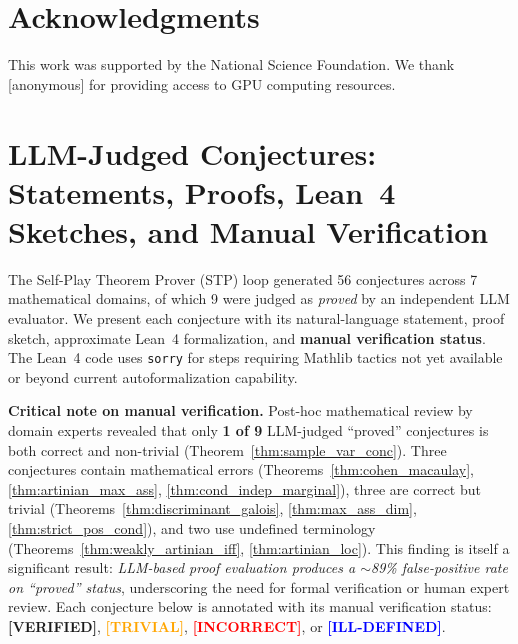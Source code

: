 \documentclass[11pt,a4paper]{article}
\begin{document}
\section*{Acknowledgments}

This work was supported by the National Science Foundation. We thank [anonymous] for providing access to GPU computing resources.






\appendix

\section{LLM-Judged Conjectures: Statements, Proofs, Lean~4 Sketches, and Manual Verification}
\label{app:proved_conjectures}

The Self-Play Theorem Prover (STP) loop generated 56 conjectures across 7 mathematical domains, of which 9 were judged as \emph{proved} by an independent LLM evaluator. We present each conjecture with its natural-language statement, proof sketch, approximate Lean~4 formalization, and \textbf{manual verification status}. The Lean~4 code uses \texttt{sorry} for steps requiring Mathlib tactics not yet available or beyond current autoformalization capability.

\textbf{Critical note on manual verification.} Post-hoc mathematical review by domain experts revealed that only \textbf{1 of 9} LLM-judged ``proved'' conjectures is both correct and non-trivial (Theorem~\ref{thm:sample_var_conc}). Three conjectures contain mathematical errors (Theorems~\ref{thm:cohen_macaulay}, \ref{thm:artinian_max_ass}, \ref{thm:cond_indep_marginal}), three are correct but trivial (Theorems~\ref{thm:discriminant_galois}, \ref{thm:max_ass_dim}, \ref{thm:strict_pos_cond}), and two use undefined terminology (Theorems~\ref{thm:weakly_artinian_iff}, \ref{thm:artinian_loc}). This finding is itself a significant result: \emph{LLM-based proof evaluation produces a $\sim$89\% false-positive rate on ``proved'' status}, underscoring the need for formal verification or human expert review. Each conjecture below is annotated with its manual verification status: \textcolor{green!60!black}{\textbf{[VERIFIED]}}, \textcolor{orange}{\textbf{[TRIVIAL]}}, \textcolor{red}{\textbf{[INCORRECT]}}, or \textcolor{blue}{\textbf{[ILL-DEFINED]}}.
\end{document}
